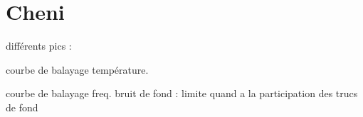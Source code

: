 \documentclass[a4paper,12pt,oneside]{article}
\begin{document}
\title{}
\author{Laurent Rohrbasser \& Tim Tuuva}

\maketitle
\tableofcontents
\baselineskip=16pt
\parindent=15pt
\parskip=5pt



\section{Cheni}


différents pics :

courbe de balayage température.


courbe de balayage freq.
bruit de fond :
limite quand a la participation des trucs de fond










\end{document}
